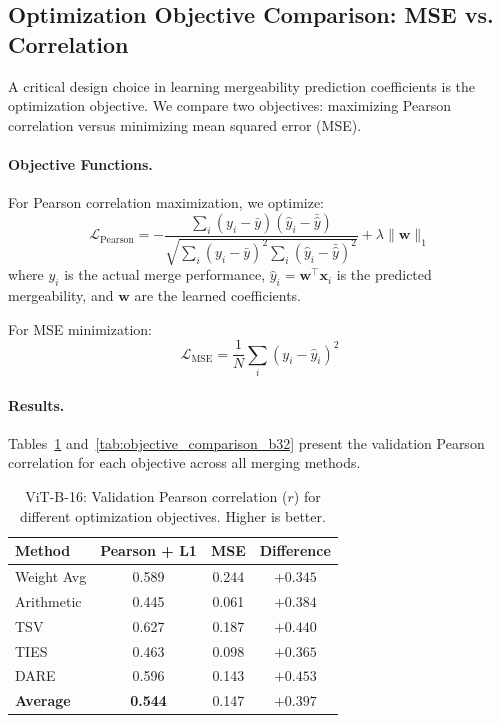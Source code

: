 \subsection{Optimization Objective Comparison: MSE vs. Correlation}
\label{sec:mse_vs_pearson}

A critical design choice in learning mergeability prediction coefficients is the optimization objective. We compare two objectives: maximizing Pearson correlation versus minimizing mean squared error (MSE).

\paragraph{Objective Functions.}
For Pearson correlation maximization, we optimize:
\begin{equation}
    \mathcal{L}_{\text{Pearson}} = -\frac{\sum_i (y_i - \bar{y})(\hat{y}_i - \bar{\hat{y}})}{\sqrt{\sum_i (y_i - \bar{y})^2 \sum_i (\hat{y}_i - \bar{\hat{y}})^2}} + \lambda \|\mathbf{w}\|_1
\end{equation}
where $y_i$ is the actual merge performance, $\hat{y}_i = \mathbf{w}^\top \mathbf{x}_i$ is the predicted mergeability, and $\mathbf{w}$ are the learned coefficients.

For MSE minimization:
\begin{equation}
    \mathcal{L}_{\text{MSE}} = \frac{1}{N}\sum_i (y_i - \hat{y}_i)^2
\end{equation}

\paragraph{Results.}
Tables~\ref{tab:objective_comparison_b16} and~\ref{tab:objective_comparison_b32} present the validation Pearson correlation for each objective across all merging methods.

\begin{table}[h]
\centering
\caption{ViT-B-16: Validation Pearson correlation ($r$) for different optimization objectives. Higher is better.}
\label{tab:objective_comparison_b16}
\begin{tabular}{@{}lccc@{}}
\toprule
\textbf{Method} & \textbf{Pearson + L1} & \textbf{MSE} & \textbf{Difference} \\
\midrule
Weight Avg & 0.589 & 0.244 & $+0.345$ \\
Arithmetic & 0.445 & 0.061 & $+0.384$ \\
TSV & 0.627 & 0.187 & $+0.440$ \\
TIES & 0.463 & 0.098 & $+0.365$ \\
DARE & 0.596 & 0.143 & $+0.453$ \\
\midrule
\textbf{Average} & \textbf{0.544} & 0.147 & $+0.397$ \\
\bottomrule
\end{tabular}
\end{table}

